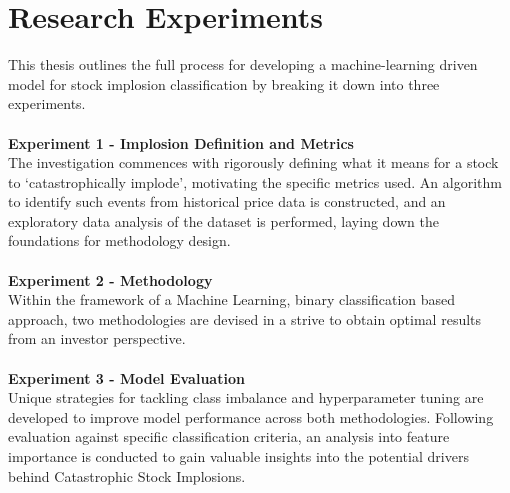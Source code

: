 \documentclass[a4paper]{report}
\begin{document}
\section{Research Experiments}
This thesis outlines the full process for developing a machine-learning driven model for stock implosion classification by breaking it down into three experiments.
\\\\ { \bfseries Experiment 1 - Implosion Definition and Metrics}
\\The investigation commences with rigorously defining what it means for a stock to ‘catastrophically implode’, motivating 
the specific metrics used. An algorithm to identify such events from historical price data is constructed, and an exploratory data analysis 
of the dataset is performed, laying down the foundations for methodology design. 
\\\\ {\bfseries Experiment 2 - Methodology}
\\Within the framework of a Machine Learning, binary classification based approach, two methodologies are devised in a strive to obtain optimal 
results from an investor perspective.
\\\\ { \bfseries Experiment 3 - Model Evaluation}
\\Unique strategies for tackling class imbalance and hyperparameter tuning are developed to improve model performance across both methodologies. Following evaluation against specific classification criteria, 
an analysis into feature importance is conducted to gain valuable insights into the potential drivers behind Catastrophic Stock Implosions.
\end{document}
